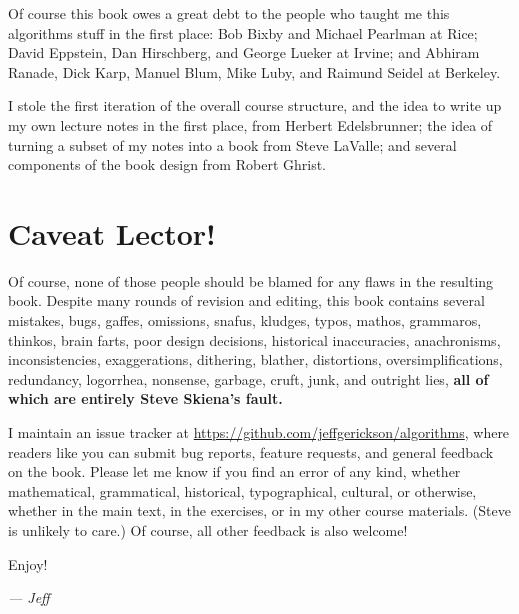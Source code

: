 Of course this book owes a great debt to the people who taught me this algorithms stuff in the first place: Bob Bixby and Michael Pearlman at Rice; David Eppstein, Dan Hirschberg, and George Lueker at Irvine; and Abhiram Ranade, Dick Karp, Manuel Blum, Mike Luby, and Raimund Seidel at Berkeley.

I stole the first iteration of the overall course structure, and the idea to write up my own lecture notes in the first place, from Herbert Edelsbrunner; the idea of turning a subset of my notes into a book from Steve LaValle; and several components of the book design from Robert Ghrist.

\section*{Caveat Lector!}

Of course, none of those people should be blamed for any flaws in the resulting book. Despite many rounds of revision and editing, this book contains several mistakes, bugs, gaffes, omissions, snafus, kludges, typos, mathos, grammaros, thinkos, brain farts, poor design decisions, historical inaccuracies, anachronisms, inconsistencies, exaggerations, dithering, blather, distortions, oversimplifications, redundancy, logorrhea, nonsense, garbage, cruft, junk, and outright lies, \textbf{all of which are entirely Steve Skiena’s fault.}

I maintain an issue tracker at {\url{https://github.com/jeffgerickson/algorithms}}, where readers like you can submit bug reports, feature requests, and general feedback on the book. Please let me know if you find an error of any kind, whether mathematical, grammatical, historical, typographical, cultural, or otherwise, whether in the main text, in the exercises, or in my other course materials. (Steve is unlikely to care.) Of course, all other feedback is also welcome!

Enjoy!

\vspace*{12bp}
\noindent\hspace*{0.655\textwidth}\textit{— Jeff}

\vspace*{\fill}

